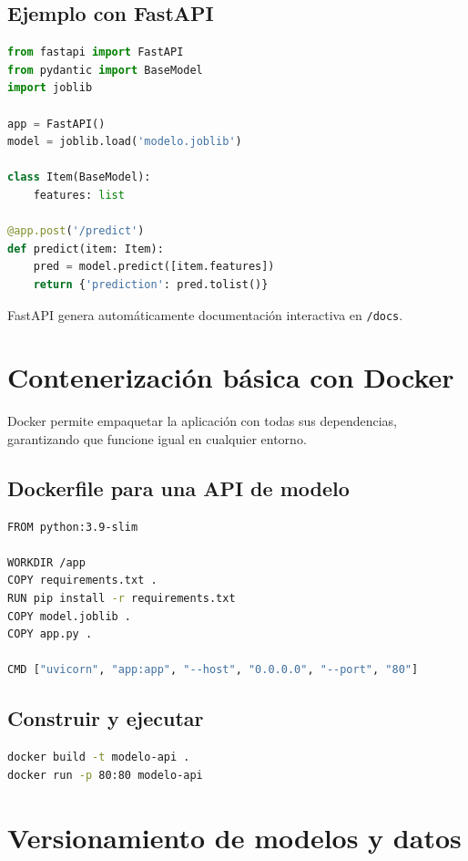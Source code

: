 \documentclass[12pt,a4paper,openany,oneside]{book}
\begin{document}
\subsection{Ejemplo con FastAPI}
\begin{lstlisting}[language=Python]
from fastapi import FastAPI
from pydantic import BaseModel
import joblib

app = FastAPI()
model = joblib.load('modelo.joblib')

class Item(BaseModel):
    features: list

@app.post('/predict')
def predict(item: Item):
    pred = model.predict([item.features])
    return {'prediction': pred.tolist()}
\end{lstlisting}

FastAPI genera automáticamente documentación interactiva en \texttt{/docs}.

\section{Contenerización básica con Docker}

Docker permite empaquetar la aplicación con todas sus dependencias, garantizando que funcione igual en cualquier entorno.

\subsection{Dockerfile para una API de modelo}
\begin{lstlisting}[language=bash]
FROM python:3.9-slim

WORKDIR /app
COPY requirements.txt .
RUN pip install -r requirements.txt
COPY model.joblib .
COPY app.py .

CMD ["uvicorn", "app:app", "--host", "0.0.0.0", "--port", "80"]
\end{lstlisting}

\subsection{Construir y ejecutar}
\begin{lstlisting}[language=bash]
docker build -t modelo-api .
docker run -p 80:80 modelo-api
\end{lstlisting}

\section{Versionamiento de modelos y datos}
\end{document}
